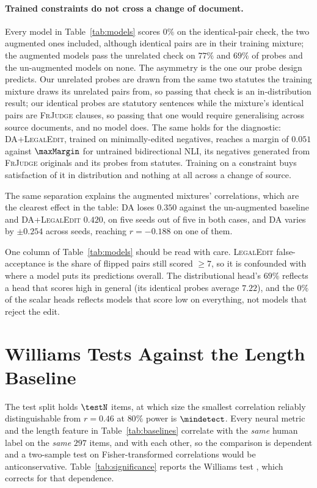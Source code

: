 \documentclass[11pt]{article}
\begin{document}
\paragraph{Trained constraints do not cross a change of document.}
Every model in Table~\ref{tab:models} scores $0\%$ on the identical-pair check,
the two augmented ones included, although identical pairs are in their training
mixture; the augmented models pass the unrelated check on $77\%$ and $69\%$ of
probes and the un-augmented models on none. The asymmetry is the one our probe
design predicts. Our unrelated probes are drawn from the same two statutes the
training mixture draws its unrelated pairs from, so passing that check is an
in-distribution result; our identical probes are statutory sentences while the
mixture's identical pairs are \textsc{FrJudge} clauses, so passing that one
would require generalising across source documents, and no model does. The same
holds for the diagnostic: \textsc{DA+LegalEdit}, trained on minimally-edited
negatives, reaches a margin of $0.051$ against $\maxMargin$ for untrained
bidirectional NLI, its negatives generated from \textsc{FrJudge} originals and
its probes from statutes. Training on a constraint buys satisfaction of it in
distribution and nothing at all across a change of source.

The same separation explains the augmented mixtures' correlations, which are the
clearest effect in the table: \textsc{DA} loses $0.350$ against the un-augmented
baseline and \textsc{DA+LegalEdit} $0.420$, on five seeds out of five in both
cases, and \textsc{DA} varies by $\pm0.254$ across seeds, reaching $r=-0.188$ on
one of them.

One column of Table~\ref{tab:models} should be read with care.
\textsc{LegalEdit} false-acceptance is the share of flipped pairs still scored
$\geq 7$, so it is confounded with where a model puts its predictions overall.
The distributional head's $69\%$ reflects a head that scores high in general
(its identical probes average $7.22$), and the $0\%$ of the scalar heads
reflects models that score low on everything, not models that reject the edit.

\section{Williams Tests Against the Length Baseline}
\label{app:williams}

The test split holds $\testN$ items, at which size the smallest correlation
reliably distinguishable from $r=0.46$ at $80\%$ power is $\mindetect$.
Every neural metric and the length feature in Table~\ref{tab:baselines}
correlate with the \emph{same} human label on the \emph{same} $297$ items, and
with each other, so the comparison is dependent and a two-sample test on
Fisher-transformed correlations would be anticonservative. Table~\ref{tab:significance}
reports the Williams test \citep{graham2014williams}, which corrects for that
dependence.
\end{document}
